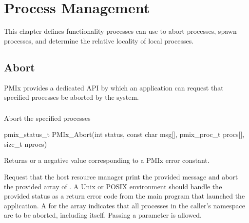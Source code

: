 \chapter{Process Management}
\label{chap:api_proc_mgmt}

This chapter defines functionality processes can use to abort processes, spawn processes, and determine the relative locality of local processes.

\section{Abort}
\label{chap:api_proc_mgmt:abort}

\ac{PMIx} provides a dedicated API by which an application can request that specified processes be aborted by the system.

\subsection{}

\summary

Abort the specified processes

\format

\cspecificstart
\begin{codepar}
pmix_status_t
PMIx_Abort(int status, const char msg[],
           pmix_proc_t procs[], size_t nprocs)
\end{codepar}
\cspecificend

\begin{arglist}
\end{arglist}

Returns  or a negative value corresponding to a PMIx error constant.

\descr

Request that the host resource manager print the provided message and abort the provided array of .
A Unix or POSIX environment should handle the provided status as a return error code from the main program that launched the application.
A  for the  array indicates that all processes in the caller's namespace are to be aborted, including itself.
Passing a   parameter is allowed.

